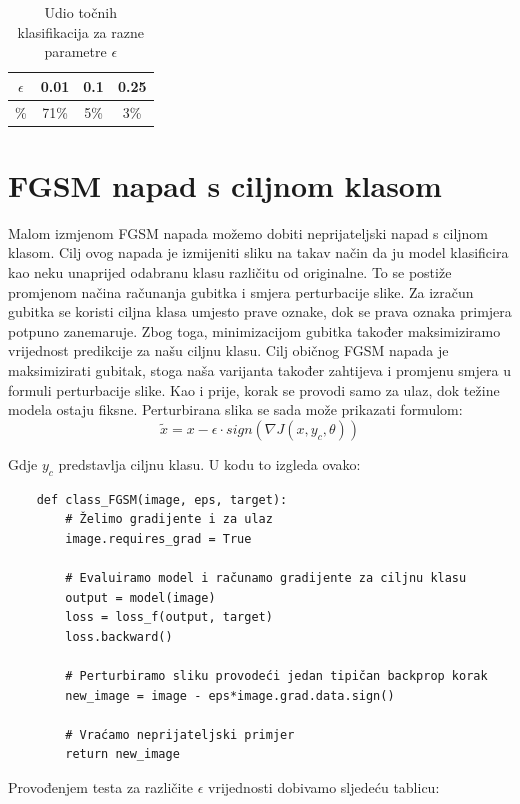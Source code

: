 \begin{table}[H]
	\centering
	\begin{tabular}{||c || c | c | c||} 
		\hline
		$\epsilon$ & 0.01 & 0.1 & 0.25 \\ [0.5ex] 
		\hline\hline
		\% & 71\% & 5\% & 3\% \\ 
		\hline
	\end{tabular}
	\caption{Udio točnih klasifikacija za razne parametre $\epsilon$}
\end{table}

\section{FGSM napad s ciljnom klasom}
\label{ciljnaklasa}

Malom izmjenom FGSM napada možemo dobiti neprijateljski napad s ciljnom klasom. Cilj ovog napada je izmijeniti sliku na takav način da ju model klasificira kao neku unaprijed odabranu klasu različitu od originalne. To se postiže promjenom načina računanja gubitka i smjera perturbacije slike. Za izračun gubitka se koristi ciljna klasa umjesto prave oznake, dok se prava oznaka primjera potpuno zanemaruje.  Zbog toga, minimizacijom gubitka također maksimiziramo vrijednost predikcije za našu ciljnu klasu. Cilj običnog FGSM napada je maksimizirati gubitak, stoga naša varijanta također zahtijeva i promjenu smjera u formuli perturbacije slike. Kao i prije, korak se provodi samo za ulaz, dok težine modela ostaju fiksne. Perturbirana slika se sada može prikazati formulom: 
\[\widetilde{x} = x - \epsilon\cdot sign\left(\nabla J(x, y_c, \theta)\right)\]

Gdje $y_c$ predstavlja ciljnu klasu. U kodu to izgleda ovako:

\begin{verbatim}
    def class_FGSM(image, eps, target):
        # Želimo gradijente i za ulaz
        image.requires_grad = True

        # Evaluiramo model i računamo gradijente za ciljnu klasu
        output = model(image)
        loss = loss_f(output, target)
        loss.backward()

        # Perturbiramo sliku provodeći jedan tipičan backprop korak
        new_image = image - eps*image.grad.data.sign()

        # Vraćamo neprijateljski primjer
        return new_image
\end{verbatim}

Provođenjem testa za različite $\epsilon$ vrijednosti dobivamo sljedeću tablicu:

